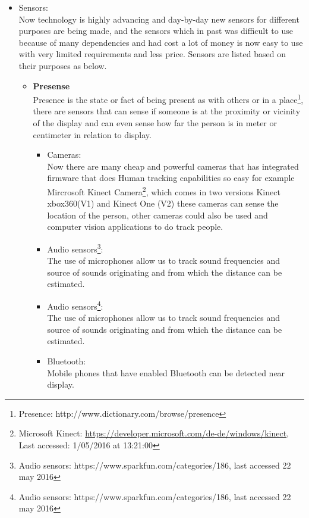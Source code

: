 \begin{itemize}
\begin{itemize}
\end{itemize}

\item Sensors: \\
Now technology is highly advancing and day-by-day new sensors for different purposes are being made, and the sensors which in past was difficult to use because of many dependencies and had cost a lot of money is now easy to use with very limited requirements and less price. Sensors are listed based on their purposes as below.


\begin{itemize}

\item \textbf{Presense} \\
Presence is the state or fact of being present as with others or in a place\footnote{Presence: http://www.dictionary.com/browse/presence}, there are sensors that can sense if someone is at the proximity or vicinity of the display and can even sense how far the person is in meter or centimeter in relation to display. 


\begin{itemize}
\item Cameras: \\
Now there are many cheap and powerful cameras that has integrated firmware that does Human tracking capabilities so easy for example Mircrosoft Kinect Camera\footnote{Microsoft Kinect: \url{https://developer.microsoft.com/de-de/windows/kinect}, Last accessed: 1/05/2016 at 13:21:00}, which comes in two versions Kinect xbox360(V1) and Kinect One (V2) these cameras can sense the location of the person, other cameras could also be used and computer vision applications to do track people. 

\item Audio sensors\footnote{Audio sensors: https://www.sparkfun.com/categories/186, last accessed 22 may 2016}: \\
The use of microphones allow us to track sound frequencies and source of sounds originating and from which the distance can be estimated.

\item Audio sensors\footnote{Audio sensors: https://www.sparkfun.com/categories/186, last accessed 22 may 2016}:\\
The use of microphones allow us to track sound frequencies and source of sounds originating and from which the distance can be estimated.

\item Bluetooth: \\
Mobile phones that have enabled Bluetooth can be detected near display.  


\end{itemize}
\end{itemize}
\end{itemize}
